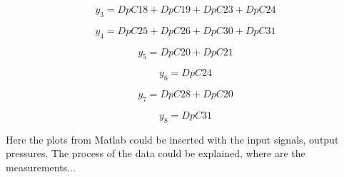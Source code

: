 \vspace{4mm}
\begin {equation}
    y_3 = DpC18 + DpC19 + DpC23 + DpC24 
\end{equation}

\vspace{4mm}
\begin {equation}
    y_4 = DpC25 + DpC26 + DpC30 + DpC31 
\end{equation}

\vspace{4mm}
\begin {equation}
     y_5 = DpC20 + DpC21  
\end{equation}

\vspace{4mm}
\begin {equation}
     y_6 = DpC24
\end{equation}


\vspace{4mm}
\begin {equation}
     y_7 = DpC28 + DpC20 
\end{equation}

\vspace{4mm}
\begin {equation}
     y_8 = DpC31 
\end{equation}

Here the plots from Matlab could be inserted with the input signals, output pressures. The process of the data could be explained, where are the measurements...

